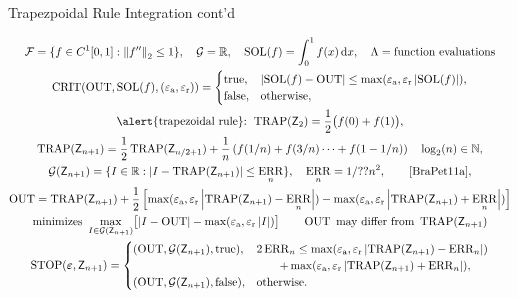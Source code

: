 \documentclass[10pt,compress,xcolor={usenames,dvipsnames},aspectratio=169]{beamer}
\DeclareMathOperator{\TRAP}{TRAP}
\DeclareMathOperator{\STOP}{STOP}
\DeclareMathOperator{\SOL}{SOL}
\DeclareMathOperator{\OUT}{OUT}
\DeclareMathOperator{\CRIT}{CRIT}
\DeclareMathOperator{\ERR}{ERR}
\newcommand{\ttrue}{\textup{true}}
\newcommand{\tfalse}{\textup{false}}
\newcommand{\tolabs}{\varepsilon_{\textup{a}}}
\newcommand{\tolrel}{\varepsilon_{\textup{r}}}
\begin{document}
\begin{frame}{Trapezpoidal Rule Integration cont'd}

\vspace{-6ex}
\begin{gather*}
	\cf = \{f \in C^1[0,1] : \norm[2]{f''} \le 1\}, \quad 
	\cg  = \reals,  \quad
	\SOL(f) = \int_0^1 f(x) \, \dif x, \quad   \Lambda = \text{function evaluations} \\
	\CRIT(\OUT, \SOL(f),(\tolabs, \tolrel))  = \begin{cases} \ttrue, & \abs{\SOL(f) - \OUT} \le \max(\tolabs,\tolrel \abs{\SOL(f)}), \\
		\tfalse, & \text{otherwise},
		\end{cases} \\
		\text{\alert{trapezoidal rule}: } 
		\TRAP(\mZ_2) = \frac 1{2} \bigl( f(0) + f(1) \bigr), \\  
		\TRAP(\mZ_{n+1}) = \frac {1}{2}\TRAP(\mZ_{n/2+1}) + \frac 1{n} \left( f(1/n) + f(3/n) \cdots + f(1 -1/n) \right)  \quad \log_2(n) \in \naturals,\\
		\cg(\mZ_{n+1}) = \{I \in \reals : \abs{I - \TRAP(\mZ_{n+1})} \le \ERR_n\},  \quad \ERR_n =  1/??n^2, \qquad \text{\cite[(7.??)]{BraPet11a}}, \\ 
		\OUT = \TRAP(\mZ_{n+1}) + \frac 12 \left[\max(\tolabs,\tolrel\abs{\TRAP(\mZ_{n+1})- \ERR_n}) - \max(\tolabs,\tolrel \abs{\TRAP(\mZ_{n+1}) +\ERR_n}) \right] \\
		\text{minimizes }  \max_{I \in \cg(\mZ_{n+1})} \bigl[ \abs{I - \OUT} - \max(\tolabs,\tolrel \abs{I}) 
		\bigr ] \qquad \OUT \text{ may differ from } \TRAP(\mZ_{n+1}) \\
	\STOP(\veps,\mZ_{n+1}) 
	= \begin{cases} 
		(\OUT,\cg(\mZ_{n+1}), \ttrue), & 
		2\ERR_n \le  \max(\tolabs,\tolrel\abs{\TRAP(\mZ_{n+1})- \ERR_n}) \\
		& \qquad + \max(\tolabs,\tolrel\abs{\TRAP(\mZ_{n+1}) +\ERR_n}), \\
		(\OUT,\cg(\mZ_{n+1}),\tfalse), & \text{otherwise}.
	\end{cases}
\end{gather*}

\end{frame}
\end{document}
